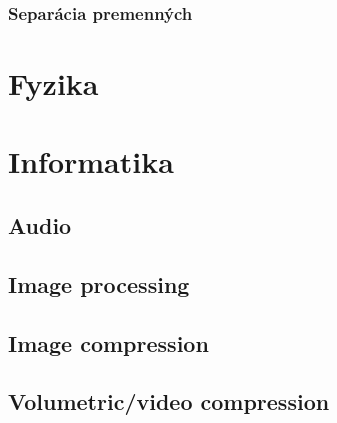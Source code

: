         \subsubsection{Separácia premenných}
    
         
\section{Fyzika}
    
    
    
\section{Informatika}
    
    \subsection{Audio}
    \subsection{Image processing}
    \subsection{Image compression}
    \subsection{Volumetric/video compression}
     
